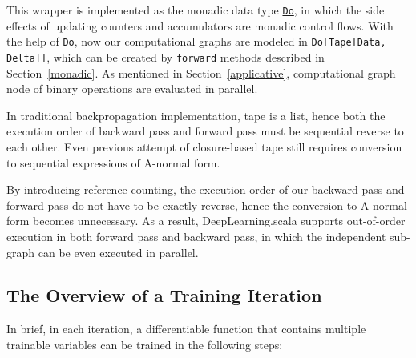 This wrapper is implemented as the monadic data type \href{https://javadoc.io/page/com.thoughtworks.raii/asynchronous_2.11/latest/com/thoughtworks/raii/asynchronous%24%24Do.html}{\lstinline{Do}}, in which the side effects of updating counters and accumulators are monadic control flows. With the help of \lstinline{Do}, now our \glspl{computational graph} are modeled in \lstinline{Do[Tape[Data, Delta]]}, which can be created by \lstinline{forward} methods described in Section~\ref{monadic}. As mentioned in Section~\ref{applicative}, \gls{computational graph} node of binary operations are evaluated in parallel.

In traditional backpropagation implementation, tape is a list, hence both the execution order of backward pass and forward pass must be sequential reverse to each other. Even previous attempt of closure-based tape\cite{pearlmutter2008reverse} still requires conversion to sequential expressions of A-normal form\cite{sabry1993reasoning}. 

By introducing reference counting, the execution order of our backward pass and forward pass do not have to be exactly reverse, hence the conversion to A-normal form becomes unnecessary. As a result, DeepLearning.scala supports out-of-order execution in both forward pass and backward pass, in which the independent sub-graph can be even executed in parallel.

\subsection{The Overview of a Training Iteration}
\label{training iteration}

In brief, in each iteration, a \gls{differentiable function} that contains multiple \glspl{trainable variable} can be trained in the following steps:

